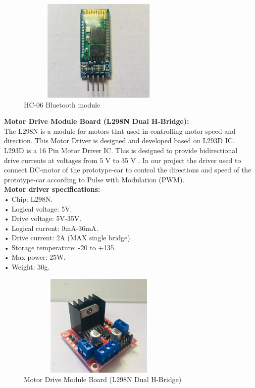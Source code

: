\documentclass[12pt,a4paper]{report}
\begin{document}
\begin{figure}[H]
    \centering
    \graphicspath{ {./images/} }
    \includegraphics[width=8cm, height=5cm]{blutooth.jpg}
    \caption{ HC-06 Bluetooth module}
    \label{fig:mesh1}
\end{figure}
\bigskip
\bigskip
\bigskip
\bigskip
\bigskip
\bigskip
\bigskip
\bigskip
\bigskip
\bigskip
\bigskip
\bigskip
\bigskip
\bigskip
\bigskip
\bigskip

\textbf{{Motor Drive Module Board (L298N Dual H-Bridge):}}\\

The L298N is a module for motors that used in controlling motor speed and direction. This Motor Driver is designed and developed based on L293D IC. L293D is a 16 Pin Motor Driver IC. This is designed to provide bidirectional drive currents at voltages from 5 V to 35 V \cite{motordriver}. In our project the driver used to connect DC-motor of the prototype-car to control the directions and speed of the prototype-car according to Pulse with Modulation (PWM).\\

\textbf{Motor driver specifications:}\\

•	Chip: L298N.\\ 
•	Logical voltage: 5V.\\
•	Drive voltage: 5V-35V.\\
•	Logical current: 0mA-36mA.\\
•	Drive current: 2A (MAX single bridge).\\
•	Storage temperature: -20 to +135.\\
•	Max power: 25W.\\
•	Weight: 30g.\\


\begin{figure}[H]
    \centering
    \graphicspath{ {./images/} }
    \includegraphics[width=8cm, height=5cm]{driver.jpg}
    \caption{ Motor Drive Module Board (L298N Dual H-Bridge)}
    \label{fig:mesh1}
\end{figure}
\end{document}

